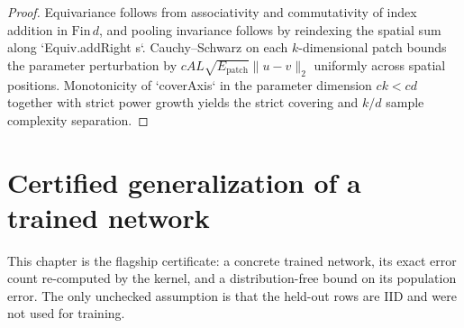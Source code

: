 \begin{proof}
\leanok
Equivariance follows from associativity and commutativity of index addition in $\mathrm{Fin}\,d$, and pooling invariance follows by reindexing the spatial sum along `Equiv.addRight s`. Cauchy--Schwarz on each $k$-dimensional patch bounds the parameter perturbation by $c A L\sqrt{E_{\mathrm{patch}}}\|u-v\|_2$ uniformly across spatial positions. Monotonicity of `coverAxis` in the parameter dimension $ck < cd$ together with strict power growth yields the strict covering and $k/d$ sample complexity separation.
\end{proof}

\chapter{Certified generalization of a trained network}

This chapter is the flagship certificate: a concrete trained network, its exact error count re-computed by the kernel, and a distribution-free bound on its population error. The only unchecked assumption is that the held-out rows are IID and were not used for training.

